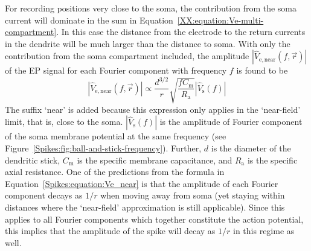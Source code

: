For recording positions very close to the soma, the contribution from the soma current will dominate 
in the sum in Equation~\ref{XX:equation:Ve-multi-compartment}. In this case the distance from the electrode
to the return currents in the dendrite will be much larger than the distance to soma. With only the contribution from
the soma compartment included, the amplitude $|\hat{V}_\mathrm{e,near}(f,\vec{r})|$  
of the EP signal for each Fourier component with frequency $f$ is found to be
%
\begin{equation}
  |\hat{V}_\mathrm{e,near}(f,\vec{r})| 
  \propto \frac{d^{3/2}}{r} \sqrt{ \frac{f C_\mathrm{m}}{R_\mathrm{a}} }  |\hat{V}_\mathrm{s}(f)| 
  \label{Spikes:equation:Ve_near}
\end{equation}
%
The suffix `near' is added because this expression only applies in the `near-field' limit, that is,
close to the soma.
$|\hat{V}_\mathrm{s}(f)|$ is the amplitude of Fourier component of the soma membrane potential at the same
frequency (see Figure~\ref{Spikes:fig:ball-and-stick-frequency}). Further, $d$ is the diameter of the dendritic
stick, $C_\mathrm{m}$ is the specific membrane capacitance, and $R_\mathrm{a}$ is the specific axial resistance.  
One of the predictions from the formula in Equation~\ref{Spikes:equation:Ve_near} is that the amplitude of each Fourier component decays
as $1/r$ when moving away from soma (yet staying within distances where the `near-field' approximation is still applicable).
Since this applies to all Fourier components which together constitute the action potential, this implies that the amplitude of the 
spike will decay as $1/r$ in this regime as well.

